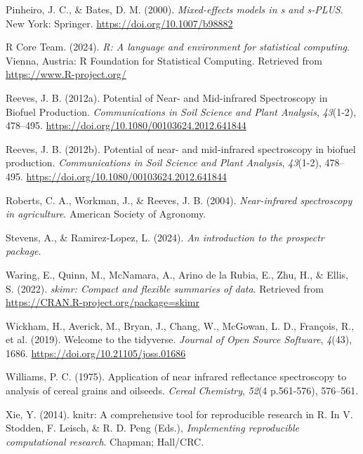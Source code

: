 \documentclass[
]{agujournal2019}
\newlength{\cslhangindent}
\newenvironment{CSLReferences}[2] %
 {\begin{list}{}{%
  \setlength{\itemindent}{0pt}
  \setlength{\leftmargin}{0pt}
  \setlength{\parsep}{0pt}
  \ifodd #1
   \setlength{\leftmargin}{\cslhangindent}
   \setlength{\itemindent}{-1\cslhangindent}
  \fi
  \setlength{\itemsep}{#2\baselineskip}}}
 {\end{list}}
\begin{document}
\begin{CSLReferences}{1}{0}
Pinheiro, J. C., \& Bates, D. M. (2000). \emph{Mixed-effects models in s
and s-PLUS}. New York: Springer. \url{https://doi.org/10.1007/b98882}

R Core Team. (2024). \emph{{R}: A language and environment for
statistical computing}. Vienna, Austria: R Foundation for Statistical
Computing. Retrieved from \url{https://www.R-project.org/}

Reeves, J. B. (2012a). Potential of {Near}- and {Mid}-infrared
{Spectroscopy} in {Biofuel} {Production}. \emph{Communications in Soil
Science and Plant Analysis}, \emph{43}(1-2), 478--495.
\url{https://doi.org/10.1080/00103624.2012.641844}

Reeves, J. B. (2012b). Potential of near- and mid-infrared spectroscopy
in biofuel production. \emph{Communications in Soil Science and Plant
Analysis}, \emph{43}(1-2), 478--495.
\url{https://doi.org/10.1080/00103624.2012.641844}

Roberts, C. A., Workman, J., \& Reeves, J. B. (2004).
\emph{Near-infrared spectroscopy in agriculture}. American Society of
Agronomy.

Stevens, A., \& Ramirez-Lopez, L. (2024). \emph{An introduction to the
prospectr package}.

Waring, E., Quinn, M., McNamara, A., Arino de la Rubia, E., Zhu, H., \&
Ellis, S. (2022). \emph{{skimr}: Compact and flexible summaries of
data}. Retrieved from \url{https://CRAN.R-project.org/package=skimr}

Wickham, H., Averick, M., Bryan, J., Chang, W., McGowan, L. D.,
François, R., et al. (2019). Welcome to the {tidyverse}. \emph{Journal
of Open Source Software}, \emph{4}(43), 1686.
\url{https://doi.org/10.21105/joss.01686}

Williams, P. C. (1975). Application of near infrared reflectance
spectroscopy to analysis of cereal grains and oilseeds. \emph{Cereal
Chemistry}, \emph{52}(4 p.561-576), 576--561.

Xie, Y. (2014). {knitr}: A comprehensive tool for reproducible research
in {R}. In V. Stodden, F. Leisch, \& R. D. Peng (Eds.),
\emph{Implementing reproducible computational research}. Chapman;
Hall/CRC.


\end{CSLReferences}
\end{document}
